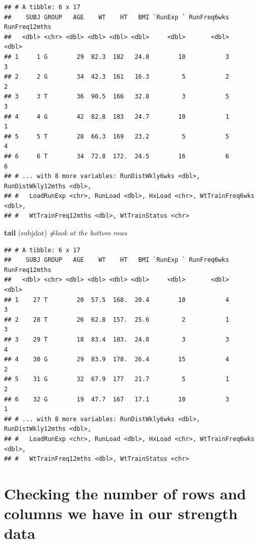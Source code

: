 \documentclass[
]{book}
\newenvironment{Shaded}{\begin{snugshade}}{\end{snugshade}}
\newcommand{\CommentTok}[1]{\textcolor[rgb]{0.56,0.35,0.01}{\textit{#1}}}
\newcommand{\KeywordTok}[1]{\textcolor[rgb]{0.13,0.29,0.53}{\textbf{#1}}}
\newcommand{\NormalTok}[1]{#1}
\begin{document}
\begin{verbatim}
## # A tibble: 6 x 17
##    SUBJ GROUP   AGE    WT    HT   BMI `RunExp ` RunFreq6wks RunFreq12mths
##   <dbl> <chr> <dbl> <dbl> <dbl> <dbl>     <dbl>       <dbl>         <dbl>
## 1     1 G        29  82.3  182   24.8        10           3             3
## 2     2 G        34  42.3  161   16.3         5           2             2
## 3     3 T        36  90.5  166   32.8         3           5             3
## 4     4 G        42  82.8  183   24.7        10           1             1
## 5     5 T        28  66.3  169   23.2         5           5             4
## 6     6 T        34  72.8  172.  24.5        16           6             6
## # ... with 8 more variables: RunDistWkly6wks <dbl>, RunDistWkly12mths <dbl>,
## #   LoadRunExp <chr>, RunLoad <dbl>, HxLoad <chr>, WtTrainFreq6wks <dbl>,
## #   WtTrainFreq12mths <dbl>, WtTrainStatus <chr>
\end{verbatim}

\begin{Shaded}
\begin{Highlighting}[]
\KeywordTok{tail}\NormalTok{ (subjdat) }\CommentTok{#look at the bottom rows}
\end{Highlighting}
\end{Shaded}

\begin{verbatim}
## # A tibble: 6 x 17
##    SUBJ GROUP   AGE    WT    HT   BMI `RunExp ` RunFreq6wks RunFreq12mths
##   <dbl> <chr> <dbl> <dbl> <dbl> <dbl>     <dbl>       <dbl>         <dbl>
## 1    27 T        20  57.5  168.  20.4        10           4             3
## 2    28 T        26  62.8  157.  25.6         2           1             3
## 3    29 T        18  83.4  183.  24.8         3           3             4
## 4    30 G        29  83.9  178.  26.4        15           4             2
## 5    31 G        32  67.9  177   21.7         5           1             2
## 6    32 G        19  47.7  167   17.1        10           3             1
## # ... with 8 more variables: RunDistWkly6wks <dbl>, RunDistWkly12mths <dbl>,
## #   LoadRunExp <chr>, RunLoad <dbl>, HxLoad <chr>, WtTrainFreq6wks <dbl>,
## #   WtTrainFreq12mths <dbl>, WtTrainStatus <chr>
\end{verbatim}

\hypertarget{checking-the-number-of-rows-and-columns-we-have-in-our-strength-data}{%
\section{Checking the number of rows and columns we have in our strength data}\label{checking-the-number-of-rows-and-columns-we-have-in-our-strength-data}}
\end{document}
